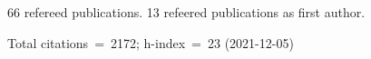66 refereed publications. 13 refeered publications as first author.

Total citations~=~2172; h-index~=~23 (2021-12-05)